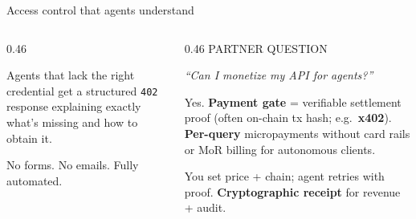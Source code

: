 \documentclass[aspectratio=169,10pt]{beamer}
\begin{document}
\begin{frame}[shrink=3]{Access control that agents understand}
\begin{columns}[T]
\begin{column}{0.46\textwidth}
{\footnotesize\color{txtm}%
Agents that lack the right credential get a structured \texttt{402} response explaining exactly what's missing and how to obtain it.\par
\vspace{3pt}
No forms. No emails. Fully automated.%
}
\end{column}
\begin{column}{0.46\textwidth}
{\footnotesize\color{slate} PARTNER QUESTION}\par
\vspace{2pt}
{\footnotesize\color{txtm}%
\textit{``Can I monetize my API for agents?''}\par
\vspace{2pt}
Yes. \textbf{Payment gate} = verifiable settlement proof (often on-chain tx hash; e.g.\ \textbf{x402}). \textbf{Per-query} micropayments without card rails or MoR billing for autonomous clients.\par
\vspace{3pt}
You set price + chain; agent retries with proof. \textbf{Cryptographic receipt} for revenue + audit.%
}
\end{column}
\end{columns}
\end{frame}
\end{document}
